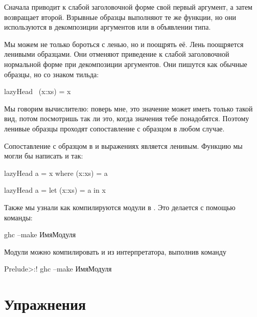 Сначала приводит к слабой заголовочной форме свой первый
аргумент, а затем возвращает второй. Взрывные образцы
выполняют те же функции, но они используются в декомпозиции 
аргументов или в объявлении типа. 

Мы можем не только бороться с ленью, но и поощрять её.
Лень поощряется ленивыми образцами. Они отменяют приведение
к слабой заголовочной нормальной форме при декомпозиции
аргументов. Они пишутся как обычные образцы, но со знаком тильда:

\begin{code}
lazyHead ~(x:xs) = x
\end{code}

Мы говорим вычислителю: поверь мне, это значение может иметь
только такой вид, потом посмотришь так ли это, когда
значения тебе понадобятся. Поэтому ленивые образцы проходят 
сопоставление с образцом в любом случае. 

Сопоставление с образцом в  и  
выражениях является ленивым. Функцию  
мы могли бы написать и так:

\begin{code}
lazyHead a = x
    where (x:xs) = a

lazyHead a = 
    let (x:xs) = a
    in  x
\end{code}

Также мы узнали как компилируются модули в . Это делается
с помощью команды:

\begin{code}
ghc --make ИмяМодуля
\end{code}

Модули можно компилировать и из интерпретатора, выполнив команду

\begin{code}
Prelude>:! ghc --make ИмяМодуля
\end{code}

\section{Упражнения}

